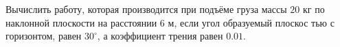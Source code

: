 Вычислить работу, которая производится при подъёме груза массы $20$ кг
по наклонной плоскости на расстоянии $6$ м, если угол образуемый плоскос
тью с горизонтом, равен $30^\circ$, а коэффициент трения равен $0.01$.
